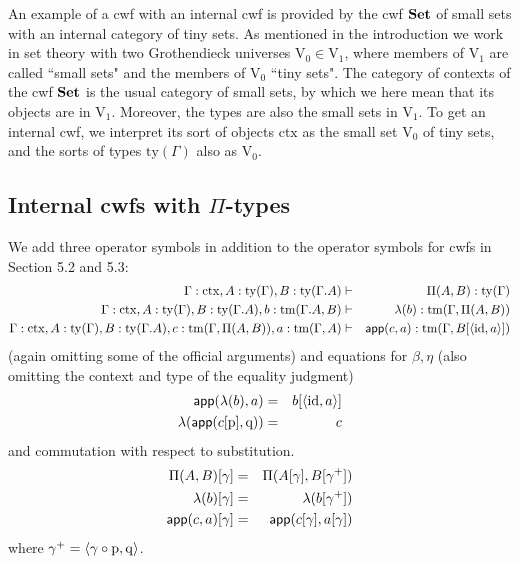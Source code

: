 \documentclass{lmcs}
\newcommand{\FYI}[1]{{\color{red}#1}}
\def\V{\mathrm{V}}
\def\id{\mathrm{id}}
\newcommand{\ctx}{\mathrm{ctx}}
\newcommand{\ty}{\mathrm{ty}}
\newcommand{\tm}{\mathrm{tm}}
\begin{document}
An example of a cwf with an internal cwf is provided by the cwf ${\bf Set}$ of small sets with an internal category of tiny sets. As mentioned in the introduction we work in set theory with two Grothendieck universes $\V_0 \in \V_1$, where members of $\V_1$ are called ``small sets" and the members of $\V_0$ ``tiny sets". The category of contexts of the cwf ${\bf Set}$ is the usual category of small sets, by which we here mean that its objects are in $\V_1$. Moreover, the types are also the small sets in $\V_1$. To get an internal cwf, we interpret its sort of objects $\ctx$ as the small set $\V_0$ of tiny sets, and the sorts of types $\ty(\Gamma)$ also as $\V_0$.


\subsection{Internal cwfs with $\Pi$-types}
We add three operator symbols in addition to the operator symbols for cwfs in Section 5.2 and 5.3:
\begin{eqnarray*}
\Gamma : \ctx, A : \ty(\Gamma), B : \ty(\Gamma.A)&\vdash& \Pi(A,B) : \ty(\Gamma)\\
\Gamma : \ctx, A : \ty(\Gamma), B : \ty(\Gamma.A), b : \tm(\Gamma.A, B) &\vdash& \lambda(b) : \tm(\Gamma,\Pi(A,B))\\
\Gamma : \ctx, A : \ty(\Gamma), B : \ty(\Gamma.A), c :  \tm(\Gamma,\Pi(A,B)), a : \tm(\Gamma, A) &\vdash& \app(c,a) : \tm(\Gamma, B[\tuple{\id,a}])
\end{eqnarray*}
(again omitting some of the official arguments)
and equations for $\beta, \eta$ (also omitting the context and type of the equality judgment)
 \begin{eqnarray*}
 \app(\lambda(b),a) &=& b[\tuple{\id,a}]\\
 \lambda(\app(c[\p],\q)) &=& c
\end{eqnarray*}
and commutation with respect to substitution.
\begin{eqnarray*}
\Pi(A,B)[ \gamma ] &=& \Pi(A [ \gamma ], B[ \gamma^+ ])\\
\lambda(b) [ \gamma ] &=& \lambda(b[\gamma^+ ])\\
\mathsf{app}(c,a) [ \gamma ] &=& \mathsf{app}(c[ \gamma ], a[ \gamma ] )
\end{eqnarray*}
where $\gamma^+ = \langle \gamma \circ \mathrm{p}, \mathrm{q} \rangle$.
\end{document}
